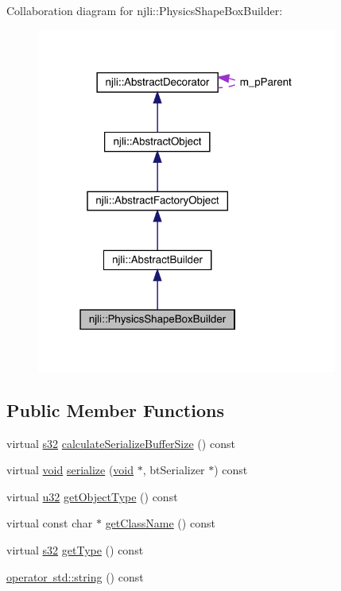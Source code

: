 Collaboration diagram for njli\+:\+:Physics\+Shape\+Box\+Builder\+:\nopagebreak
\begin{figure}[H]
\begin{center}
\leavevmode
\includegraphics[width=280pt]{classnjli_1_1_physics_shape_box_builder__coll__graph}
\end{center}
\end{figure}
\subsection*{Public Member Functions}
\begin{DoxyCompactItemize}
\item 
virtual \mbox{\hyperlink{_util_8h_aa62c75d314a0d1f37f79c4b73b2292e2}{s32}} \mbox{\hyperlink{classnjli_1_1_physics_shape_box_builder_a31c3fbfa9ce02a424e57525247db6133}{calculate\+Serialize\+Buffer\+Size}} () const
\item 
virtual \mbox{\hyperlink{_thread_8h_af1e856da2e658414cb2456cb6f7ebc66}{void}} \mbox{\hyperlink{classnjli_1_1_physics_shape_box_builder_a7f70d7647631101be450c593dfc3553a}{serialize}} (\mbox{\hyperlink{_thread_8h_af1e856da2e658414cb2456cb6f7ebc66}{void}} $\ast$, bt\+Serializer $\ast$) const
\item 
virtual \mbox{\hyperlink{_util_8h_a10e94b422ef0c20dcdec20d31a1f5049}{u32}} \mbox{\hyperlink{classnjli_1_1_physics_shape_box_builder_a1d1f75cc3ba31ea15c935260b2401e97}{get\+Object\+Type}} () const
\item 
virtual const char $\ast$ \mbox{\hyperlink{classnjli_1_1_physics_shape_box_builder_a81c30888998942dae14ca1ed4c766b10}{get\+Class\+Name}} () const
\item 
virtual \mbox{\hyperlink{_util_8h_aa62c75d314a0d1f37f79c4b73b2292e2}{s32}} \mbox{\hyperlink{classnjli_1_1_physics_shape_box_builder_ac0de9c8dfd8cb0bf1499bdc5e916d022}{get\+Type}} () const
\item 
\mbox{\hyperlink{classnjli_1_1_physics_shape_box_builder_aff2b20bb67ff6ad148976dd1629d1698}{operator std\+::string}} () const
\end{DoxyCompactItemize}
